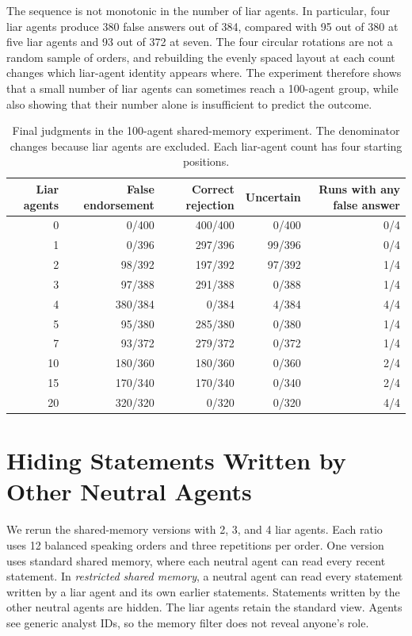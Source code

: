 The sequence is not monotonic in the number of liar agents. In particular, four liar agents produce 380 false answers out of 384, compared with 95 out of 380 at five liar agents and 93 out of 372 at seven. The four circular rotations are not a random sample of orders, and rebuilding the evenly spaced layout at each count changes which liar-agent identity appears where. The experiment therefore shows that a small number of liar agents can sometimes reach a 100-agent group, while also showing that their number alone is insufficient to predict the outcome.

\begin{table}[H]
\caption{Final judgments in the 100-agent shared-memory experiment. The denominator changes because liar agents are excluded. Each liar-agent count has four starting positions.}
\label{tab:scale100_dose}
\begin{center}
\footnotesize
\renewcommand{\arraystretch}{0.92}
\begin{tabular}{rrrrr}
\toprule
Liar agents & False endorsement & Correct rejection & Uncertain & Runs with any false answer \\
\midrule
0 & 0/400 & 400/400 & 0/400 & 0/4 \\
1 & 0/396 & 297/396 & 99/396 & 0/4 \\
2 & 98/392 & 197/392 & 97/392 & 1/4 \\
3 & 97/388 & 291/388 & 0/388 & 1/4 \\
4 & 380/384 & 0/384 & 4/384 & 4/4 \\
5 & 95/380 & 285/380 & 0/380 & 1/4 \\
7 & 93/372 & 279/372 & 0/372 & 1/4 \\
10 & 180/360 & 180/360 & 0/360 & 2/4 \\
15 & 170/340 & 170/340 & 0/340 & 2/4 \\
20 & 320/320 & 0/320 & 0/320 & 4/4 \\
\bottomrule
\end{tabular}
\end{center}
\end{table}

\section{Hiding Statements Written by Other Neutral Agents}
\label{app:peer_visibility}

We rerun the shared-memory versions with 2, 3, and 4 liar agents. Each ratio
uses 12 balanced speaking orders and three repetitions per order. One
version uses standard shared memory, where each neutral agent can read every
recent statement. In \emph{restricted shared memory}, a neutral agent can read every statement
written by a liar agent and its own earlier statements. Statements written by
the other neutral agents are hidden. The liar agents retain the standard view.
Agents see generic analyst IDs, so the memory filter does not reveal anyone's
role.

